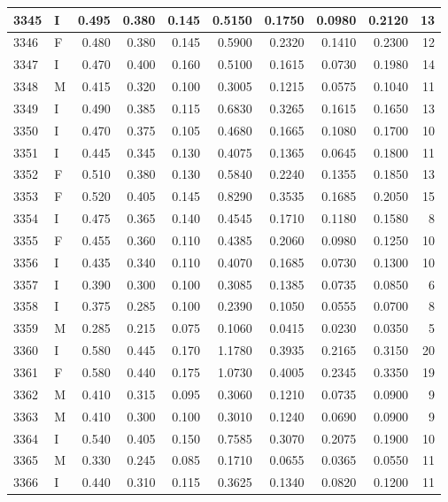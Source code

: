 \documentclass[9pt,twocolumn,twoside,]{pnas-new}
\begin{document}
\begin{tabular}{l|l|r|r|r|r|r|r|r|r}
\hline
3345 & I & 0.495 & 0.380 & 0.145 & 0.5150 & 0.1750 & 0.0980 & 0.2120 & 13\\
\hline
3346 & F & 0.480 & 0.380 & 0.145 & 0.5900 & 0.2320 & 0.1410 & 0.2300 & 12\\
\hline
3347 & I & 0.470 & 0.400 & 0.160 & 0.5100 & 0.1615 & 0.0730 & 0.1980 & 14\\
\hline
3348 & M & 0.415 & 0.320 & 0.100 & 0.3005 & 0.1215 & 0.0575 & 0.1040 & 11\\
\hline
3349 & I & 0.490 & 0.385 & 0.115 & 0.6830 & 0.3265 & 0.1615 & 0.1650 & 13\\
\hline
3350 & I & 0.470 & 0.375 & 0.105 & 0.4680 & 0.1665 & 0.1080 & 0.1700 & 10\\
\hline
3351 & I & 0.445 & 0.345 & 0.130 & 0.4075 & 0.1365 & 0.0645 & 0.1800 & 11\\
\hline
3352 & F & 0.510 & 0.380 & 0.130 & 0.5840 & 0.2240 & 0.1355 & 0.1850 & 13\\
\hline
3353 & F & 0.520 & 0.405 & 0.145 & 0.8290 & 0.3535 & 0.1685 & 0.2050 & 15\\
\hline
3354 & I & 0.475 & 0.365 & 0.140 & 0.4545 & 0.1710 & 0.1180 & 0.1580 & 8\\
\hline
3355 & F & 0.455 & 0.360 & 0.110 & 0.4385 & 0.2060 & 0.0980 & 0.1250 & 10\\
\hline
3356 & I & 0.435 & 0.340 & 0.110 & 0.4070 & 0.1685 & 0.0730 & 0.1300 & 10\\
\hline
3357 & I & 0.390 & 0.300 & 0.100 & 0.3085 & 0.1385 & 0.0735 & 0.0850 & 6\\
\hline
3358 & I & 0.375 & 0.285 & 0.100 & 0.2390 & 0.1050 & 0.0555 & 0.0700 & 8\\
\hline
3359 & M & 0.285 & 0.215 & 0.075 & 0.1060 & 0.0415 & 0.0230 & 0.0350 & 5\\
\hline
3360 & I & 0.580 & 0.445 & 0.170 & 1.1780 & 0.3935 & 0.2165 & 0.3150 & 20\\
\hline
3361 & F & 0.580 & 0.440 & 0.175 & 1.0730 & 0.4005 & 0.2345 & 0.3350 & 19\\
\hline
3362 & M & 0.410 & 0.315 & 0.095 & 0.3060 & 0.1210 & 0.0735 & 0.0900 & 9\\
\hline
3363 & M & 0.410 & 0.300 & 0.100 & 0.3010 & 0.1240 & 0.0690 & 0.0900 & 9\\
\hline
3364 & I & 0.540 & 0.405 & 0.150 & 0.7585 & 0.3070 & 0.2075 & 0.1900 & 10\\
\hline
3365 & M & 0.330 & 0.245 & 0.085 & 0.1710 & 0.0655 & 0.0365 & 0.0550 & 11\\
\hline
3366 & I & 0.440 & 0.310 & 0.115 & 0.3625 & 0.1340 & 0.0820 & 0.1200 & 11\\

\end{tabular}
\end{document}
